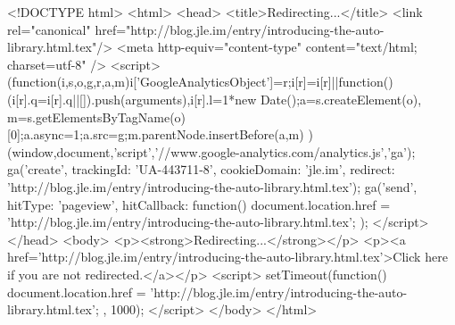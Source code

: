 <!DOCTYPE html>
<html>
<head>
<title>Redirecting...</title>
<link rel="canonical" href="http://blog.jle.im/entry/introducing-the-auto-library.html.tex"/>
<meta http-equiv="content-type" content="text/html; charset=utf-8" />
<script>
(function(i,s,o,g,r,a,m){i['GoogleAnalyticsObject']=r;i[r]=i[r]||function(){
(i[r].q=i[r].q||[]).push(arguments)},i[r].l=1*new Date();a=s.createElement(o),
m=s.getElementsByTagName(o)[0];a.async=1;a.src=g;m.parentNode.insertBefore(a,m)
})(window,document,'script','//www.google-analytics.com/analytics.js','ga');
ga('create', { trackingId: 'UA-443711-8', cookieDomain: 'jle.im', redirect: 'http://blog.jle.im/entry/introducing-the-auto-library.html.tex'});
ga('send', { hitType: 'pageview', hitCallback: function() { document.location.href = 'http://blog.jle.im/entry/introducing-the-auto-library.html.tex'; } });
</script>
</head>
<body>
  <p><strong>Redirecting...</strong></p>
  <p><a href='http://blog.jle.im/entry/introducing-the-auto-library.html.tex'>Click here if you are not redirected.</a></p>
  <script>
    setTimeout(function() { document.location.href = 'http://blog.jle.im/entry/introducing-the-auto-library.html.tex'; }, 1000);
  </script>
</body>
</html>
